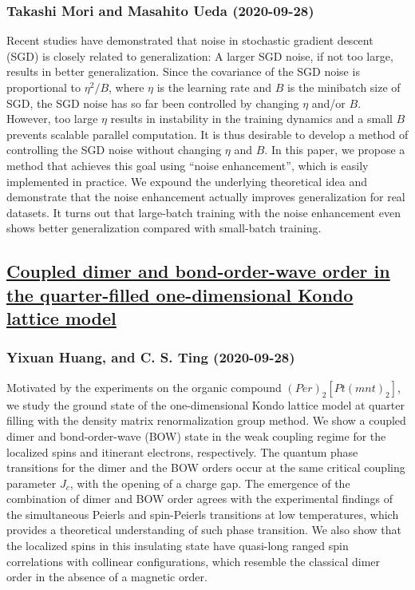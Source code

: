 \subsubsection*{Takashi Mori and Masahito Ueda (2020-09-28)}
Recent studies have demonstrated that noise in stochastic gradient descent
(SGD) is closely related to generalization: A larger SGD noise, if not too
large, results in better generalization. Since the covariance of the SGD noise
is proportional to $\eta^2/B$, where $\eta$ is the learning rate and $B$ is the
minibatch size of SGD, the SGD noise has so far been controlled by changing
$\eta$ and/or $B$. However, too large $\eta$ results in instability in the
training dynamics and a small $B$ prevents scalable parallel computation. It is
thus desirable to develop a method of controlling the SGD noise without
changing $\eta$ and $B$. In this paper, we propose a method that achieves this
goal using ``noise enhancement'', which is easily implemented in practice. We
expound the underlying theoretical idea and demonstrate that the noise
enhancement actually improves generalization for real datasets. It turns out
that large-batch training with the noise enhancement even shows better
generalization compared with small-batch training.

\subsection*{\href{http://arxiv.org/abs/2009.13089v1}{Coupled dimer and bond-order-wave order in the quarter-filled  one-dimensional Kondo lattice model}}
\subsubsection*{Yixuan Huang, and C. S. Ting (2020-09-28)}
Motivated by the experiments on the organic compound
$(Per)_{2}[Pt(mnt)_{2}]$, we study the ground state of the one-dimensional
Kondo lattice model at quarter filling with the density matrix renormalization
group method. We show a coupled dimer and bond-order-wave (BOW) state in the
weak coupling regime for the localized spins and itinerant electrons,
respectively. The quantum phase transitions for the dimer and the BOW orders
occur at the same critical coupling parameter $J_{c}$, with the opening of a
charge gap. The emergence of the combination of dimer and BOW order agrees with
the experimental findings of the simultaneous Peierls and spin-Peierls
transitions at low temperatures, which provides a theoretical understanding of
such phase transition. We also show that the localized spins in this insulating
state have quasi-long ranged spin correlations with collinear configurations,
which resemble the classical dimer order in the absence of a magnetic order.

